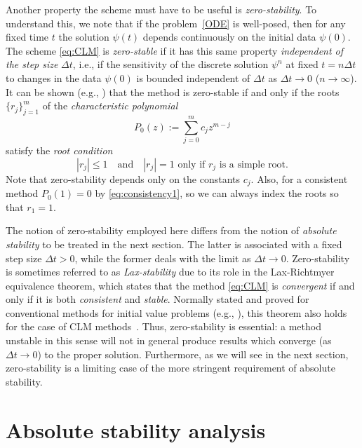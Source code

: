 \documentclass[12pt]{article}
\newcommand{\dt}{\Delta t}
\newcommand{\abs}[1]{\left|{#1}\right|}
\begin{document}
Another property the scheme must have to be useful is \emph{zero-stability}.  To
understand this, we note that if the problem~\eqref{ODE} is well-posed, then
for any fixed time $t$ the solution $\psi(t)$ depends continuously on the
initial data $\psi(0)$.  The scheme \eqref{eq:CLM} is \emph{zero-stable} if it has
this same property \emph{independent of the step size} $\dt$, i.e., if the
sensitivity of the discrete solution $\psi^n$ at fixed $t=n\dt$ to changes in
the data $\psi(0)$ is bounded independent of $\dt$ as $\dt\to0$
($n\to\infty$).  It can be shown (e.g., \cite{Stoer_Bulirsch92}) that the method
is zero-stable if and only if the roots $\{r_j\}_{j=1}^m$ of the
\emph{characteristic polynomial} 
\begin{equation}
  P_0(z) := \sum_{j=0}^{m} c_j z^{m-j}
\label{eq:spoly}
\end{equation}
satisfy the \emph{root condition}
\begin{equation}
  \abs{r_j}\le1\quad\mbox{and}\quad
  \abs{r_j}=1\mbox{ only if $r_j$ is a simple root}.
\label{eq:rootcondition}
\end{equation}
Note that zero-stability depends only on the constants $c_j$.  Also, for a
consistent method $P_0(1)=0$ by \eqref{eq:consistency1}, so we can always
index the roots so that $r_1=1$.

The notion of zero-stability employed here differs from the notion of
\emph{absolute stability} to be treated in the next section.  The latter is
associated with a fixed step size $\dt>0$, while the former deals with the
limit as $\dt\to0$.  Zero-stability is sometimes referred to as
\emph{Lax-stability} due to its role in the Lax-Richtmyer equivalence theorem,
which states that the method \eqref{eq:CLM} is \emph{convergent} if and only
if it is both \emph{consistent} and \emph{stable}.  Normally stated and proved
for conventional methods for initial value problems (e.g.,
\cite{Stoer_Bulirsch92}), this theorem also holds for the case of CLM
methods~\cite{Kang94}.  Thus, zero-stability is essential:  a method unstable
in this sense will not in general produce results which converge (as
$\dt\to0$) to the proper solution.  Furthermore, as we will see in the next
section, zero-stability is a limiting case of the more stringent requirement
of absolute stability.

\pagebreak[4]
\section{Absolute stability analysis\label{sec:abstab}}
\setcounter{equation}{0}
\end{document}
